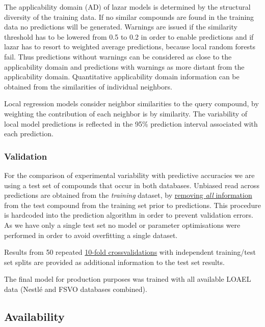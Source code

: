 \documentclass[]{achemso}
\begin{document}
The applicability domain (AD) of lazar models is determined by the
structural diversity of the training data. If no similar compounds are
found in the training data no predictions will be generated. Warnings
are issued if the similarity threshold has to be lowered from 0.5 to 0.2
in order to enable predictions and if lazar has to resort to weighted
average predictions, because local random forests fail. Thus predictions
without warnings can be considered as close to the applicability domain
and predictions with warnings as more distant from the applicability
domain. Quantitative applicability domain information can be obtained
from the similarities of individual neighbors.

Local regression models consider neighbor similarities to the query
compound, by weighting the contribution of each neighbor is by
similarity. The variability of local model predictions is reflected in
the 95\% prediction interval associated with each prediction.

\subsubsection{Validation}\label{validation}

For the comparison of experimental variability with predictive
accuracies we are using a test set of compounds that occur in both
databases. Unbiased read across predictions are obtained from the
\emph{training} dataset, by
\href{https://github.com/opentox/lazar/blob/loael-paper.revision/lib/model.rb\#L233-L237}{removing
\emph{all} information} from the test compound from the training set
prior to predictions. This procedure is hardcoded into the prediction
algorithm in order to prevent validation errors. As we have only a
single test set no model or parameter optimisations were performed in
order to avoid overfitting a single dataset.

Results from 50 repeated
\href{https://github.com/opentox/lazar/blob/loael-paper.revision/lib/crossvalidation.rb\#L10-L48}{10-fold
crossvalidations} with independent training/test set splits are provided
as additional information to the test set results.

The final model for production purposes was trained with all available
LOAEL data (Nestlé and FSVO databases combined).

\subsection{Availability}\label{availability}
\end{document}
